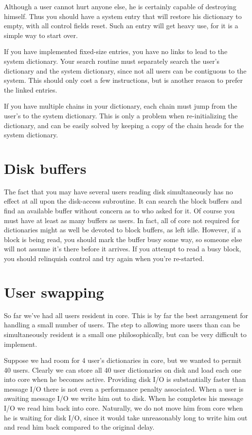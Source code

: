 \documentclass[b5paper, oneside]{book}
\begin{document}
Although a user cannot hurt anyone else, he is certainly capable of destroying himself. Thus you should have a system entry that will restore his dictionary to empty, with all control fields reset. Such an entry will get heavy use, for it is a simple way to start over.

If you have implemented fixed-size entries, you have no links to lead to the system dictionary. Your search routine must separately search the user's dictionary and the system dictionary, since not all users can be contiguous to the system. This should only cost a few instructions, but is another reason to prefer the linked entries.

If you have multiple chains in your dictionary, each chain must jump from the user's to the system dictionary. This is only a problem when re-initializing the dictionary, and can be easily solved by keeping a copy of the chain heads for the system dictionary.

\section{Disk buffers}
The fact that you may have several users reading disk simultaneously has no effect at all upon the disk-access subroutine. It can search the block buffers and find an available buffer without concern as to who asked for it. Of course you must have at least as many buffers as users. In fact, all of core not required for dictionaries might as well be devoted to block buffers, as left idle. However, if a block is being read, you should mark the buffer busy some way, so someone else will not assume it's there before it arrives. If you attempt to read a busy block, you should relinquish control and try again when you're re-started.

\section{User swapping}
So far we've had all users resident in core. This is by far the best arrangement for handling a small number of users. The step to allowing more users than can be simultaneously resident is a small one philosophically, but can be very difficult to implement.

Suppose we had room for 4 user's dictionaries in core, but we wanted to permit 40 users. Clearly we can store all 40 user dictionaries on disk and load each one into core when he becomes active. Providing disk I/O is substantially faster than message I/O there is not even a performance penalty associated. When a user is awaiting message I/O we write him out to disk. When he completes his message I/O we read him back into core. Naturally, we do not move him from core when he is waiting for disk I/O, since it would take unreasonably long to write him out and read him back compared to the original delay.
\end{document}
